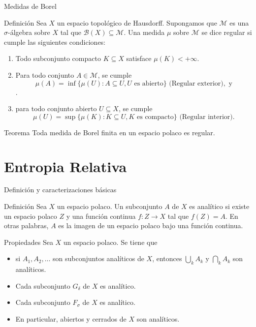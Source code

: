 \documentclass[8pt]{beamer}
\begin{document}
\begin{frame}{Medidas de Borel}
 \begin{block}{Definición}
        Sea $X$ un espacio topológico de Hausdorff. Supongamos que $\mathcal{M}$ es una $\sigma$-álgebra sobre $X$ tal que $\mathcal{B}(X) \subseteq \mathcal{M}$. Una medida $\mu$ sobre $\mathcal{M}$ se dice regular si cumple las siguientes condiciones:
        \begin{enumerate}
            \item Todo subconjunto compacto $K \subseteq X$ satisface $\mu(K) < +\infty$.
            \item  Para todo conjunto $A \in \mathcal{M}$, se cumple $$\mu(A) = \inf \{\mu(U): A \subseteq U, U \text{ es abierto}\}\text{ (Regular exterior)}, \text{ y}$$.
            \item para todo conjunto abierto $U \subseteq X$, se cumple $$\mu(U) = \sup \{\mu(K): K \subseteq U, K \text{ es compacto} \} \text{ (Regular interior)}.$$
        \end{enumerate}
    \end{block}
    \begin{block}{Teorema}
        Toda medida de Borel finita en un espacio polaco es regular. 
    \end{block}
\end{frame}


\section{Entropia Relativa}
\begin{frame}{Definición y caracterizaciones básicas}
    \begin{block}{Definición}
        Sea $X$ un espacio polaco. Un subconjunto $A$ de $X$ es analítico si existe un espacio polaco $Z$ y una función continua $f:Z \longrightarrow X$ tal que $f(Z)=A$. En otras palabras, $A$ es la imagen de un espacio polaco bajo una función continua.
    \end{block}
\pause
    \begin{block}{Propiedades}
         Sea $X$ un espacio polaco. Se tiene que
         \begin{itemize}
             \item si $A_1,A_2, \dots$ son subconjuntos analíticos de $X$, entonces  $\displaystyle \bigcup_k A_k$ y $\displaystyle \bigcap_k A_k$ son analíticos.
             \item Cada subconjunto $G_\delta$ de $X$ es analítico.
             \item Cada subconjunto $F_\sigma$ de $X$ es analítico.
         \end{itemize}
    \end{block}
    \pause
    \begin{itemize}
        \item En particular, abiertos y cerrados de $X$ son analíticos.
    \end{itemize}
\end{frame}
\end{document}
